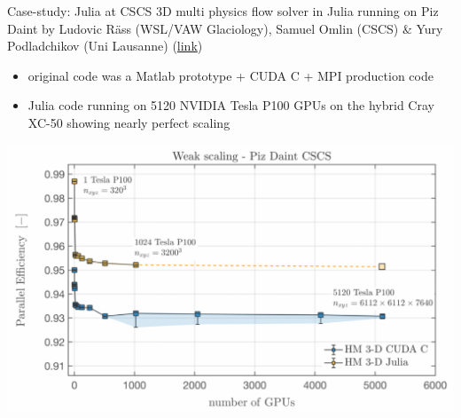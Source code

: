 \documentclass[compress,presentation,aspectratio=169]{beamer}
\begin{document}
\begin{frame}[label={sec:org5eae3db}]{Case-study: Julia at CSCS}
  \footnotesize
\alert{3D multi physics flow solver} in Julia running on Piz Daint
by Ludovic Räss (WSL/VAW Glaciology), Samuel Omlin (CSCS) \& Yury
Podladchikov (Uni Lausanne) (\href{https://ptsolvers.github.io/}{link})

\begin{itemize}
\item original code was a Matlab prototype + CUDA C + MPI production code
\item Julia code running on 5120 NVIDIA Tesla P100 GPUs on the hybrid Cray XC-50
showing nearly perfect scaling
\end{itemize}

\begin{center}
\includegraphics[width=.7\linewidth]{./figs/piz-daint.png}
\end{center}
\end{frame}
\end{document}

